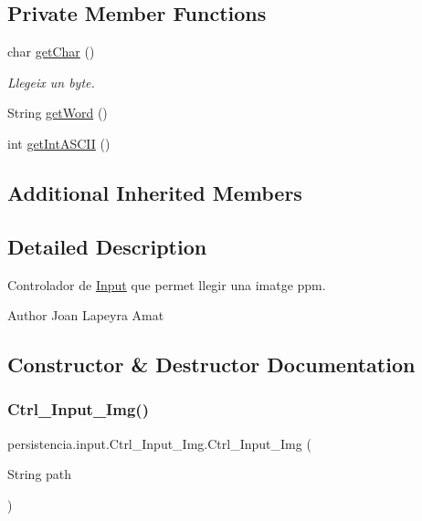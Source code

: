 \subsection*{Private Member Functions}
\begin{DoxyCompactItemize}
\item 
char \hyperlink{classpersistencia_1_1input_1_1Ctrl__Input__Img_a85a204b05c118b07d403e9b59d7f18c0}{get\+Char} ()
\begin{DoxyCompactList}\small\item\em Llegeix un byte. \end{DoxyCompactList}\item 
String \hyperlink{classpersistencia_1_1input_1_1Ctrl__Input__Img_a4219a110d7d84e7b883ffd88e18a0def}{get\+Word} ()
\item 
int \hyperlink{classpersistencia_1_1input_1_1Ctrl__Input__Img_a430158ff229038ddc3476d406239f4cd}{get\+Int\+A\+S\+C\+II} ()
\end{DoxyCompactItemize}
\subsection*{Additional Inherited Members}


\subsection{Detailed Description}
Controlador de \hyperlink{classpersistencia_1_1input_1_1Input}{Input} que permet llegir una imatge ppm. 

\begin{DoxyAuthor}{Author}
Joan Lapeyra Amat 
\end{DoxyAuthor}


\subsection{Constructor \& Destructor Documentation}
\mbox{\label{classpersistencia_1_1input_1_1Ctrl__Input__Img_a79318a62df31dfd107554e92e29f6d9a}} 
\subsubsection{\texorpdfstring{Ctrl\+\_\+\+Input\+\_\+\+Img()}{Ctrl\_Input\_Img()}}
{\footnotesize\ttfamily persistencia.\+input.\+Ctrl\+\_\+\+Input\+\_\+\+Img.\+Ctrl\+\_\+\+Input\+\_\+\+Img (\begin{DoxyParamCaption}\item[{String}]{path }\end{DoxyParamCaption})\hspace{0.3cm}{\ttfamily [inline]}}



